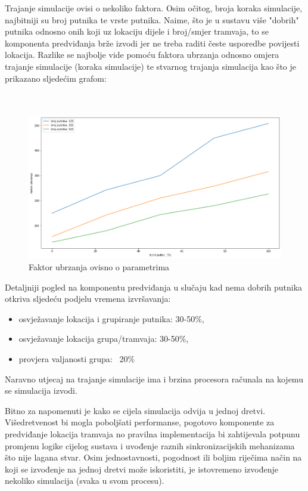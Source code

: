 \documentclass[times, utf8, diplomski]{fer}
\begin{document}
Trajanje simulacije ovisi o nekoliko faktora. Osim očitog, broja koraka simulacije, najbitniji su broj putnika te vrste putnika. Naime, što je u sustavu više "dobrih" putnika odnosno onih koji uz lokaciju dijele i broj/smjer tramvaja, to se komponenta predviđanja brže izvodi jer ne treba raditi česte usporedbe povijesti lokacija. Razlike se najbolje vide pomoću faktora ubrzanja odnosno omjera trajanje simulacije (koraka simulacije) te stvarnog trajanja simulacija kao što je prikazano sljedećim grafom:\\\\\\

\begin{figure}[htb]
    \centering
    \includegraphics[width=1\textwidth]{images/simulation_performanse_graph.png}
    \caption{Faktor ubrzanja ovisno o parametrima}\label{fig:simulation_performanse}
\end{figure}


Detaljniji pogled na komponentu predviđanja u slučaju kad nema dobrih putnika otkriva sljedeću podjelu vremena izvršavanja:
\begin{itemize}
    \item osvježavanje lokacija i grupiranje putnika: 30-50\%,
    \item osvježavanje lokacija grupa/tramvaja: 30-50\%,
    \item provjera valjanosti grupa: ~20\%
\end{itemize}

Naravno utjecaj na trajanje simulacije ima i brzina procesora računala na kojemu se simulacija izvodi.

Bitno za napomenuti je kako se cijela simulacija odvija u jednoj dretvi. Višedretvenost bi mogla poboljšati performanse, pogotovo komponente za predviđanje lokacija tramvaja no pravilna implementacija bi zahtijevala potpunu promjenu logike cijelog sustava i uvođenje raznih sinkronizacijskih mehanizama što nije lagana stvar. Osim jednostavnosti, pogodnost ili boljim riječima način na koji se izvođenje na jednoj dretvi može iskoristiti, je istovremeno izvođenje nekoliko simulacija (svaka u svom procesu).
\end{document}
